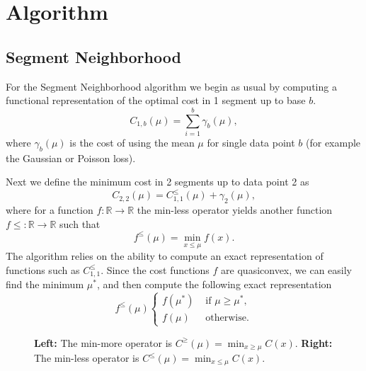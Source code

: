 \documentclass{article}
\newcommand{\RR}{\mathbb R}
\begin{document}
\section{Algorithm}

\subsection{Segment Neighborhood}

For the Segment Neighborhood algorithm we begin as usual by computing
a functional representation of the optimal cost in 1 segment up to
base $b$. 
\begin{equation*}
  \label{eq:C1b}
  C_{1,b}(\mu) = \sum_{i=1}^b \gamma_b(\mu),
\end{equation*}
where $\gamma_b(\mu)$ is the cost of using the mean $\mu$ for single
data point $b$ (for example the Gaussian or Poisson loss).

Next we define the minimum cost in 2 segments up to data point 2 as
\begin{equation*}
  \label{eq:C22}
  C_{2,2}(\mu) = C_{1,1}^{\leq}(\mu) + \gamma_2(\mu),
\end{equation*}
where for a function $f:\RR\rightarrow\RR$ the min-less operator
yields another function $f\leq:\RR\rightarrow\RR$ such that
\begin{equation}
  \label{eq:min-less}
  f^{\leq}(\mu) = \min_{x\leq \mu} f(x).
\end{equation}
The algorithm relies on the ability to compute an exact representation
of functions such as $C_{1,1}^{\leq}$. Since the cost functions $f$
are quasiconvex, we can easily find the minimum $\mu^*$, and then
compute the following exact representation
\begin{equation*}
  f^\leq(\mu)
  \begin{cases}
    f(\mu^*) & \text{ if } \mu \geq \mu^*,\\
    f(\mu) & \text{ otherwise.}
  \end{cases}
\end{equation*}

\begin{figure}[!t]
  \parbox{3in}{
    \begin{center}
    
    \end{center}
  }
  \parbox{3in}{
    \begin{center}
      
    \end{center}
  }
  \caption{\label{fig:min-operators} \textbf{Left:} The min-more
    operator is $C^{\geq}(\mu)=\min_{x\geq \mu}C(x)$. \textbf{Right:}
    The min-less operator is $C^{\leq}(\mu)=\min_{x\leq
      \mu}C(x)$.}
\end{figure}
\end{document}
